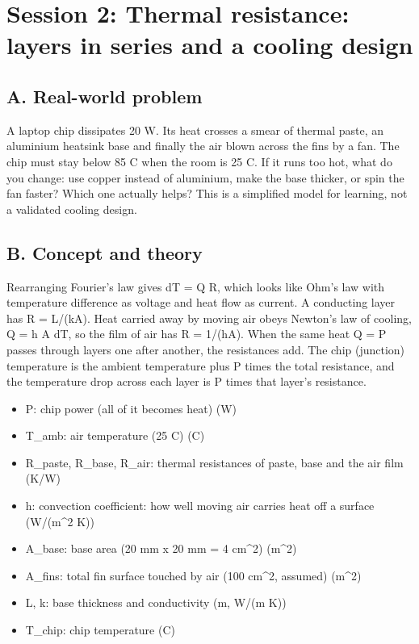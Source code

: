 \documentclass[11pt,a4paper]{article}
\begin{document}
\section{Session 2: Thermal resistance: layers in series and a cooling design}

\subsection*{A. Real-world problem}
A laptop chip dissipates 20 W. Its heat crosses a smear of thermal paste, an aluminium heatsink base and finally the air blown across the fins by a fan. The chip must stay below 85 C when the room is 25 C. If it runs too hot, what do you change: use copper instead of aluminium, make the base thicker, or spin the fan faster? Which one actually helps? This is a simplified model for learning, not a validated cooling design.

\subsection*{B. Concept and theory}
Rearranging Fourier's law gives dT = Q R, which looks like Ohm's law with temperature difference as voltage and heat flow as current. A conducting layer has R = L/(kA). Heat carried away by moving air obeys Newton's law of cooling, Q = h A dT, so the film of air has R = 1/(hA). When the same heat Q = P passes through layers one after another, the resistances add. The chip (junction) temperature is the ambient temperature plus P times the total resistance, and the temperature drop across each layer is P times that layer's resistance.

\begin{itemize}[nosep]
\item P: chip power (all of it becomes heat) (W)
\item T\_amb: air temperature (25 C) (C)
\item R\_paste, R\_base, R\_air: thermal resistances of paste, base and the air film (K/W)
\item h: convection coefficient: how well moving air carries heat off a surface (W/(m\textasciicircum{}2 K))
\item A\_base: base area (20 mm x 20 mm = 4 cm\textasciicircum{}2) (m\textasciicircum{}2)
\item A\_fins: total fin surface touched by air (100 cm\textasciicircum{}2, assumed) (m\textasciicircum{}2)
\item L, k: base thickness and conductivity (m, W/(m K))
\item T\_chip: chip temperature (C)
\end{itemize}
\end{document}
